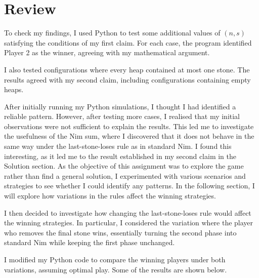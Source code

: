 \documentclass[11pt]{article}
\newcommand{\keywordfont}{\textsc}
\newcommand{\keyword}[1]{%
  \marginpar{\raggedright\small\keywordfont{#1}}}
\begin{document}
\section{Review}

\keyword{CHECK}
To check my findings, I used Python to test
some additional values of $(n,s)$ satisfying
the conditions of my first claim.
For each case, the program identified Player 2 as the winner, agreeing with my mathematical argument.

I also tested configurations where every heap contained at most one stone. The results agreed with my second claim, including configurations containing empty heaps.



\keyword{REFLECT}
After initially running my Python simulations, I thought I had identified a reliable pattern. However, after testing more cases, I realised that my initial observations were not sufficient to explain the results. This led me to investigate the usefulness of the Nim sum, where I discovered that it does not behave in the same way under the last-stone-loses rule as in standard Nim. I found this interesting, as it led me to the result established in my second claim in the Solution section. As the objective of this assignment was to explore the game rather than find a general solution, I experimented with various scenarios and strategies to see whether I could identify any patterns. In the following section, I will explore how variations in the rules affect the winning strategies.


\keyword{EXTENSION}
I then decided to investigate how changing
the last-stone-loses rule would affect the
winning strategies. In particular, I considered
the variation where the player who removes
the final stone wins, essentially turning
the second phase into standard Nim while
keeping the first phase unchanged.


\pagebreak

\keyword{NOTICE}
I modified my Python code to compare the
winning players under both variations,
assuming optimal play. Some of the
results are shown below.
\end{document}
